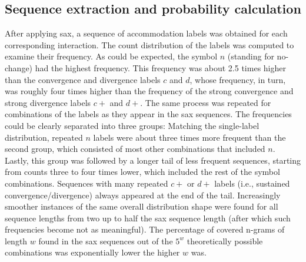 \subsection{Sequence extraction and probability calculation}
\label{subsec:word_extraction_and_seq_prob}

After applying \ac{sax}, a sequence of accommodation labels was obtained for each corresponding interaction.
The count distribution of the labels was computed to examine their frequency.
As could be expected, the symbol $n$ (standing for no-change) had the highest frequency.
This frequency was about 2.5 times higher than the convergence and divergence labels $c$ and $d$, whose frequency, in turn, was roughly four times higher than the frequency of the strong convergence and strong divergence labels $c+$ and $d+$.
The same process was repeated for combinations of the labels as they appear in the \ac{sax} sequences.
The frequencies could be clearly separated into three groups:
Matching the single-label distribution, repeated $n$ labels were about three times more frequent than the second group, which consisted of most other combinations that included $n$.
Lastly, this group was followed by a longer tail of less frequent sequences, starting from counts three to four times lower, which included the rest of the symbol combinations.
Sequences with many repeated $c+$ or $d+$ labels (i.e., sustained convergence/divergence) always appeared at the end of the tail.
Increasingly smoother instances of the same overall distribution shape were found for all sequence lengths from two up to half the \ac{sax} sequence length (after which such frequencies become not as meaningful).
The percentage of covered n-grams of length $w$ found in the \ac{sax} sequences out of the $5^w$ theoretically possible combinations was exponentially lower the higher $w$ was.


